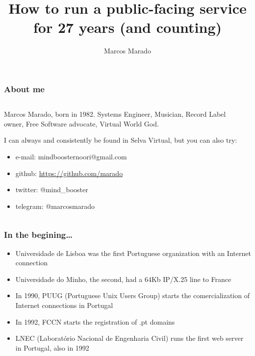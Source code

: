 \documentclass[aspectratio=169]{beamer}
\title{How to run a public-facing service for 27 years (and counting)}
\author{Marcos Marado}
\begin{document}
\frame[plain]{\titlepage}
 
\begin{frame}
\frametitle{About me}
\begin{columns}[T]
\begin{column}{.5\textwidth}
\begin{block}{Marcos Marado, born in 1982. Systems Engineer, Musician, Record Label owner, Free Software advocate, Virtual World God.}

I can always and consistently be found in Selva Virtual, but you can also try:

\begin{itemize}
\item{} e-mail: mindboosternoori@gmail.com
\item{} github: \url{https://github.com/marado}
\item{} twitter: @mind\_booster
\item{} telegram: @marcosmarado
\end{itemize}
\end{block}
\end{column}
\begin{column}{.5\textwidth}
\begin{center}





\end{center}
\end{column}
\end{columns}
\end{frame}

\begin{frame}
\frametitle{In the begining\ldots}
  \begin{itemize}
    \item{} Universidade de Lisboa was the first Portuguese organization with an Internet connection
    \item{} Universidade do Minho, the second, had a 64Kb IP/X.25 line to France
    \item{} In 1990, PUUG (Portuguese Unix Users Group) starts the comercialization of Internet connections in Portugal
    \item{} In 1992, FCCN starts the registration of .pt domains
    \item{} LNEC (Laboratório Nacional de Engenharia Civil) runs the first web server in Portugal, also in 1992
  \end{itemize}
\end{frame}
\end{document}
